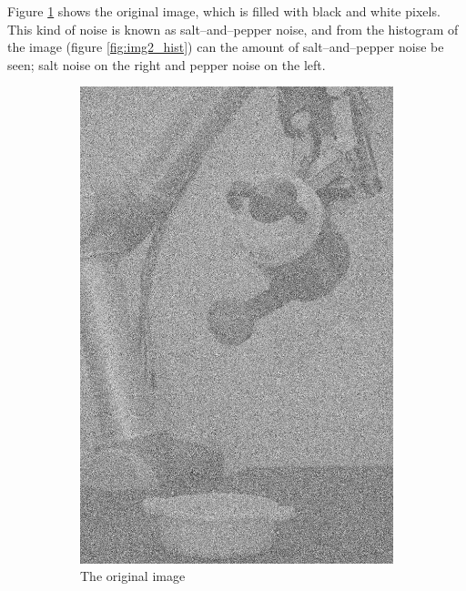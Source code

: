 Figure \ref{fig:img2_src} shows the original image, which is filled with black and white pixels. This kind of noise is known as salt--and--pepper noise, and from the histogram of the image (figure \ref{fig:img2_hist}) can the amount of salt--and--pepper noise be seen; salt noise on the right and pepper noise on the left. 
\begin{figure}[H]
    \centering
    \begin{subfigure}[b]{0.23\textwidth}
        \includegraphics[width=\textwidth]{img2/src.png}
        \caption{The original image}
        \label{fig:img2_src}
    \end{subfigure}
    \begin{subfigure}[b]{0.446\textwidth}

\end{subfigure}
\end{figure}
